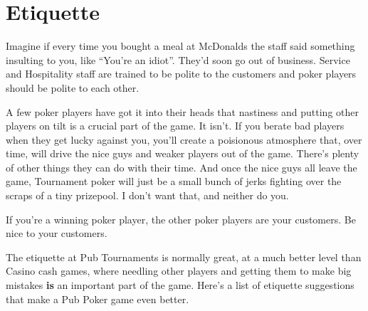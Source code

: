 \chapter{Etiquette}


Imagine if every time you bought a meal at McDonalds the staff
said something insulting to you, like ``You're an idiot''. They'd
soon go out of business. Service and Hospitality staff are trained
to be polite to the customers and poker players should be polite to
each other.

A few poker players have got it into their heads that nastiness
and putting other players on tilt is a crucial part of the game.
It isn't. If you berate bad players when they get lucky against
you, you'll create a poisionous atmosphere that, over time, will
drive the nice guys and weaker players out of the game. There's plenty
of other things they can do with their time. And once the nice
guys all leave the game, Tournament poker will just be a small
bunch of jerks fighting over the scraps of a tiny prizepool. I don't
want that, and neither do you.

If you're a winning poker player, the other poker players are
your customers. Be nice to your customers.

The etiquette at Pub Tournaments is normally great, at a much
better level than Casino cash games, where needling other players
and getting them to make big mistakes \textbf{is} an important
part of the game. Here's a list of etiquette suggestions that
make a Pub Poker game even better.

